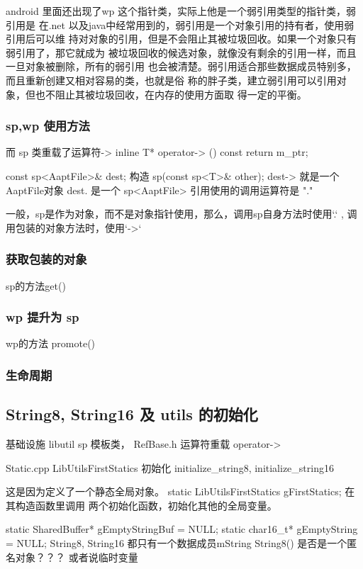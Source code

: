 \documentclass[a4paper,11pt]{article}
\begin{document}
android 里面还出现了wp 这个指针类，实际上他是一个弱引用类型的指针类，弱引用是
在.net 以及java中经常用到的，弱引用是一个对象引用的持有者，使用弱引用后可以维
持对对象的引用，但是不会阻止其被垃圾回收。如果一个对象只有弱引用了，那它就成为
被垃圾回收的候选对象，就像没有剩余的引用一样，而且一旦对象被删除，所有的弱引用
也会被清楚。弱引用适合那些数据成员特别多，而且重新创建又相对容易的类，也就是俗
称的胖子类，建立弱引用可以引用对象，但也不阻止其被垃圾回收，在内存的使用方面取
得一定的平衡。

\subsubsection{sp,wp 使用方法}
而 sp 类重载了运算符-> 
    inline  T*      operator-> () const { return m_ptr;  }

const sp<AaptFile>\& dest;  构造   sp(const sp<T>\& other);
dest-> 就是一个AaptFile对象
dest.  是一个 sp<AaptFile>
引用使用的调用运算符是 "."

一般，sp是作为对象，而不是对象指针使用，那么，调用sp自身方法时使用`.` ,
调用包装的对象方法时，使用`->`

\subsubsection{获取包装的对象} 
sp的方法get()

\subsubsection{wp 提升为 sp}
wp的方法 promote()
\subsubsection{生命周期}


\subsection{ String8, String16 及 utils 的初始化 }
基础设施 libutil 
sp 模板类， RefBase.h    运算符重载 operator->

Static.cpp  LibUtilsFirstStatics   初始化 initialize_string8,
initialize_string16 

这是因为定义了一个静态全局对象。
static LibUtilsFirstStatics gFirstStatics;
在其构造函数里调用 两个初始化函数，初始化其他的全局变量。 

static SharedBuffer* gEmptyStringBuf = NULL;
static char16_t* gEmptyString = NULL;
String8, String16 都只有一个数据成员mString
String8() 是否是一个匿名对象？？？  或者说临时变量
\end{document}
